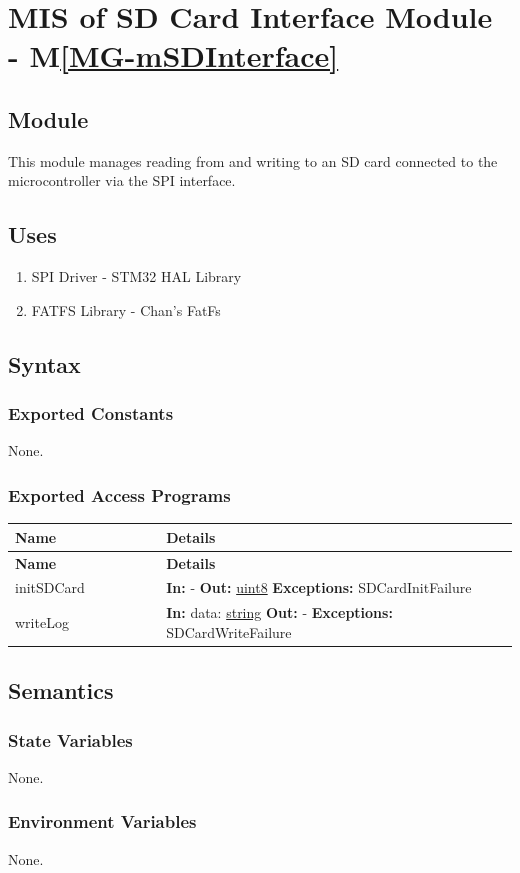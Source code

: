 \documentclass[12pt, titlepage]{article}
\newcommand{\mref}[1]{M\ref{#1}}
\newenvironment{apitable}{%
\begin{center}
\begin{longtable}{|p{0.3\linewidth}|p{0.7\linewidth}|} 
\hline
\textbf{Name} & \textbf{Details} \\
\hline
\endfirsthead
\hline
\textbf{Name} & \textbf{Details} \\
\hline
\endhead
\hline
\endfoot
\hline
\endlastfoot
}{%
\end{longtable}
\end{center}
}
\newcommand{\apifunc}[4]{%
#1 & 
\textbf{In:} #2 \newline
\textbf{Out:} #3 \newline
\textbf{Exceptions:} #4 \\
\hline
}
\begin{document}
\newpage
\section{MIS of SD Card Interface Module \label{mod:sdcard} -
\mref{MG-mSDInterface}}

\subsection{Module}
This module manages reading from and writing to an SD card connected to the
microcontroller via the SPI interface.

\subsection{Uses}
\begin{enumerate}
  \item SPI Driver - STM32 HAL Library \cite{STM_USER_MANUAL}
  \item FATFS Library - Chan's FatFs \cite{CHAN_FATFS}
\end{enumerate}

\subsection{Syntax}
\subsubsection{Exported Constants}
None.

\subsubsection{Exported Access Programs}
\begin{apitable}
  \apifunc{initSDCard}
    {-}
    {\hyperref[generic:uint8]{uint8}}
    {SDCardInitFailure}
  \apifunc{writeLog}
    {data: \hyperref[generic:string]{string}}
    {-}
    {SDCardWriteFailure}
\end{apitable}

\subsection{Semantics}
\subsubsection{State Variables}
None.
\subsubsection{Environment Variables}
None.
\end{document}
